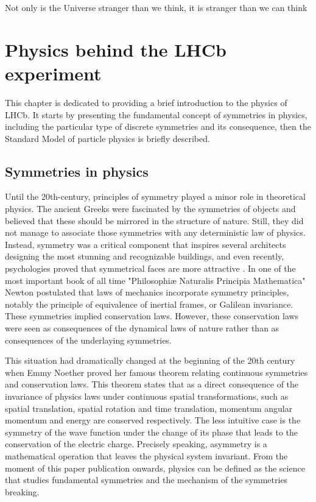 \begin{savequote}[75mm]
Not only is the Universe stranger than we think, it is stranger than we can think
\end{savequote}

\chapter{Physics behind the LHCb experiment }
\label{chapter:physics}

This chapter is dedicated to providing a brief introduction to the physics of LHCb. It starts by presenting the fundamental concept of symmetries in physics, including the particular type of discrete symmetries and its consequence, then the Standard Model of particle physics is briefly described. 

\section{Symmetries in physics}
Until the 20th-century, principles of symmetry played a minor role in theoretical physics. The ancient Greeks were fascinated by the symmetries of objects and believed that these should be mirrored in the structure of nature. Still, they did not manage to associate those symmetries with any deterministic law of physics. Instead, symmetry was a critical component that inspires several architects designing the most stunning and recognizable buildings, and even recently, psychologies proved that symmetrical faces are more attractive \cite{faces}. 
In one of the most important book of all time "Philosophiæ Naturalis Principia Mathematica" \cite{newton} 
Newton postulated that laws of mechanics incorporate symmetry principles, notably the principle of equivalence of inertial frames, or Galilean invariance. These symmetries implied conservation laws. However, these conservation laws were seen as consequences of the dynamical laws of nature rather than as consequences of the underlaying symmetries.  

This situation had dramatically changed at the beginning of the 20th century when Emmy Noether proved her famous theorem relating continuous symmetries and conservation laws.
This theorem states that as a direct consequence of the invariance of physics laws under continuous spatial transformations, such as spatial translation, spatial rotation and time translation, momentum angular momentum and energy are conserved respectively. The less intuitive case is the symmetry of the wave function under the change of its phase that leads to the conservation of the electric charge. Precisely speaking, asymmetry is a mathematical operation that leaves the physical system invariant. 
From the moment of this paper publication onwards, physics can be defined as the science that studies fundamental symmetries and the mechanism of the symmetries breaking.  


